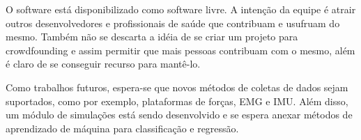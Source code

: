 \documentclass[journal]{IEEEtran}
\begin{document}
O software está disponibilizado como software livre. A intenção da equipe é atrair outros desenvolvedores
e profissionais de saúde que contribuam e usufruam do mesmo. Também não se descarta a idéia de se
criar um projeto para crowdfounding e assim permitir que mais pessoas contribuam com o mesmo, além
é claro de se conseguir recurso para mantê-lo.

Como trabalhos futuros, espera-se que novos métodos de coletas de dados sejam suportados, como por exemplo, plataformas de forças, EMG e IMU. Além disso, um módulo de simulações está sendo desenvolvido e se espera 
anexar métodos de aprendizado de máquina para classificação e regressão.



%
%

\end{document}
